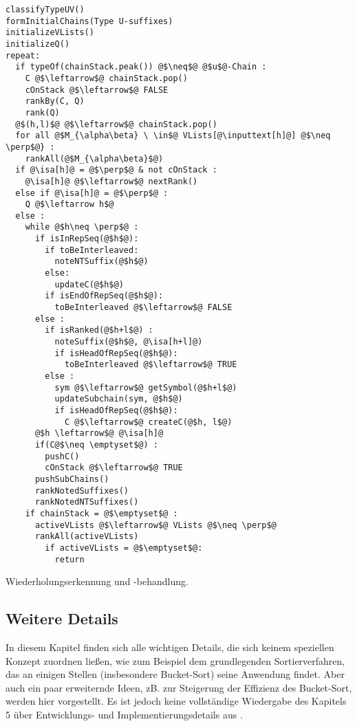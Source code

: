 \begin{listing}[htp]
\begin{verbatim}
classifyTypeUV()
formInitialChains(Type U-suffixes)
initializeVLists()
initializeQ()
repeat:
  if typeOf(chainStack.peak()) @$\neq$@ @$u$@-Chain :
    C @$\leftarrow$@ chainStack.pop()
    cOnStack @$\leftarrow$@ FALSE
    rankBy(C, Q)
    rank(Q) 
  @$(h,l)$@ @$\leftarrow$@ chainStack.pop()	
  for all @$M_{\alpha\beta} \ \in$@ VLists[@\inputtext[h]@] @$\neq \perp$@} :
    rankAll(@$M_{\alpha\beta}$@)  
  if @\isa[h]@ = @$\perp$@ & not cOnStack :
    @\isa[h]@ @$\leftarrow$@ nextRank()	
  else if @\isa[h]@ = @$\perp$@ :
    Q @$\leftarrow h$@	
  else :
    while @$h\neq \perp$@ :   
      if isInRepSeq(@$h$@):
        if toBeInterleaved:
          noteNTSuffix(@$h$@)
        else:
          updateC(@$h$@)          
        if isEndOfRepSeq(@$h$@):
          toBeInterleaved @$\leftarrow$@ FALSE      
      else :
        if isRanked(@$h+l$@) :
          noteSuffix(@$h$@, @\isa[h+l]@)
          if isHeadOfRepSeq(@$h$@):
            toBeInterleaved @$\leftarrow$@ TRUE       
        else :
          sym @$\leftarrow$@ getSymbol(@$h+l$@)
          updateSubchain(sym, @$h$@)
          if isHeadOfRepSeq(@$h$@):
            C @$\leftarrow$@ createC(@$h, l$@)
      @$h \leftarrow$@ @\isa[h]@	
	  if(C@$\neq \emptyset$@) :
	    pushC()
	    cOnStack @$\leftarrow$@ TRUE	    
      pushSubChains()	
      rankNotedSuffixes()
      rankNotedNTSuffixes()   	
    if chainStack = @$\emptyset$@ :
      activeVLists @$\leftarrow$@ VLists @$\neq \perp$@
      rankAll(activeVLists)
        if activeVLists = @$\emptyset$@:
          return
\end{verbatim}
\caption{Wiederholungserkennung und -behandlung.}
\label{wiedSeq}
\end{listing}


\subsection{Weitere Details} \label{Details}

In diesem Kapitel finden sich alle wichtigen Details, die sich keinem speziellen Konzept zuordnen ließen, wie zum Beispiel dem grundlegenden Sortierverfahren, das an einigen Stellen (insbesondere Bucket-Sort) seine Anwendung findet. Aber auch ein paar erweiternde Ideen, zB. zur Steigerung der Effizienz des Bucket-Sort, werden hier vorgestellt.
Es ist jedoch keine vollständige Wiedergabe des Kapitels 5 über \glqq Entwicklungs- und Implementierungsdetails\grqq{} aus \cite{Maniscalco}.

